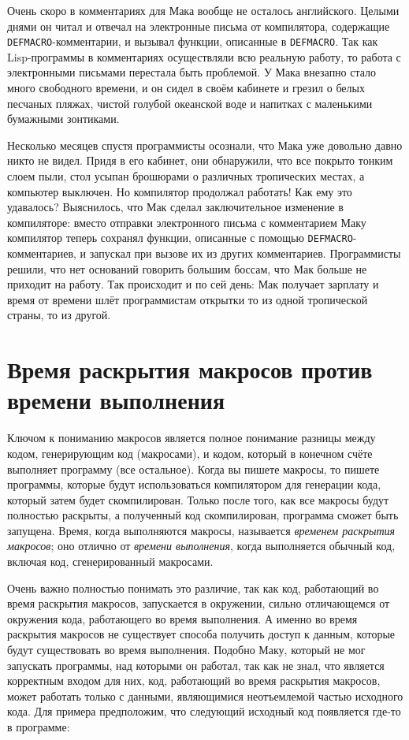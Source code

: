 Очень скоро в комментариях для Мака вообще не осталось английского. Целыми днями он читал
и отвечал на электронные письма от компилятора, содержащие
\lstinline{DEFMACRO}-комментарии, и вызывал функции, описанные в \lstinline{DEFMACRO}. Так
как Lisp-программы в комментариях осуществляли всю реальную работу, то работа с
электронными письмами перестала быть проблемой. У Мака внезапно стало много свободного
времени, и он сидел в своём кабинете и грезил о белых песчаных пляжах, чистой голубой
океанской воде и напитках с маленькими бумажными зонтиками.

Несколько месяцев спустя программисты осознали, что Мака уже довольно давно никто не
видел. Придя в его кабинет, они обнаружили, что все покрыто тонким слоем пыли, стол усыпан
брошюрами о различных тропических местах, а компьютер выключен. Но компилятор продолжал
работать! Как ему это удавалось? Выяснилось, что Мак сделал заключительное изменение в
компиляторе: вместо отправки электронного письма с комментарием Маку компилятор теперь
сохранял функции, описанные с помощью \lstinline{DEFMACRO}-комментариев, и запускал при
вызове их из других комментариев. Программисты решили, что нет оснований говорить большим
боссам, что Мак больше не приходит на работу. Так происходит и по сей день: Мак получает
зарплату и время от времени шлёт программистам открытки то из одной тропической страны, то
из другой.

\section{Время раскрытия макросов против времени выполнения}

Ключом к пониманию макросов является полное понимание разницы между кодом, генерирующим
код (макросами), и кодом, который в конечном счёте выполняет программу (все
остальное). Когда вы пишете макросы, то пишете программы, которые будут использоваться
компилятором для генерации кода, который затем будет скомпилирован. Только после того, как
все макросы будут полностью раскрыты, а полученный код скомпилирован, программа сможет
быть запущена. Время, когда выполняются макросы, называется \textit{временем раскрытия
  макросов}; оно отлично от \textit{времени выполнения}, когда выполняется обычный код,
включая код, сгенерированный макросами.

Очень важно полностью понимать это различие, так как код, работающий во время раскрытия
макросов, запускается в окружении, сильно отличающемся от окружения кода, работающего во
время выполнения. А именно во время раскрытия макросов не существует способа получить
доступ к данным, которые будут существовать во время выполнения. Подобно Маку, который не
мог запускать программы, над которыми он работал, так как не знал, что является корректным
входом для них, код, работающий во время раскрытия макросов, может работать только с
данными, являющимися неотъемлемой частью исходного кода. Для примера предположим, что
следующий исходный код появляется где-то в программе:

